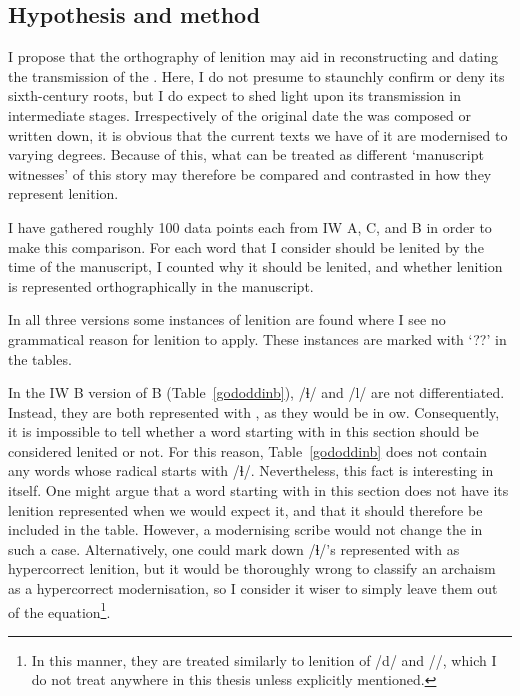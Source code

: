 
\subsection{Hypothesis and method}
I propose that the orthography of lenition may aid in reconstructing and dating the transmission of the . Here, I do not presume to staunchly confirm or deny its sixth-century roots, but I do expect to shed light upon its transmission in intermediate stages. Irrespectively of the original date the  was composed or written down, it is obvious that the current texts we have of it are modernised to varying degrees. Because of this, what can be treated as different `manuscript witnesses' of this story may therefore be compared and contrasted in how they represent lenition.

I have gathered roughly 100 data points each from IW A, C, and B in order to make this comparison. For each word that I consider should be lenited by the time of the manuscript, I counted why it should be lenited, and whether lenition is represented orthographically in the manuscript. 

In all three versions some instances of lenition are found where I see no grammatical reason for lenition to apply. These instances are marked with `??' in the tables. 

In the IW B version of  B (Table~\ref{gododdinb}), /ɬ/ and /l/ are not differentiated. Instead, they are both represented with , as they would be in \gls{ow}. Consequently, it is impossible to tell whether a word starting with  in this section should be considered lenited or not. For this reason, Table~\ref{gododdinb} does not contain any words whose radical starts with /ɬ/. Nevertheless, this fact is interesting in itself. One might argue that a word starting with  in this section does not have its lenition represented when we would expect it, and that it should therefore be included in the table. However, a modernising scribe would not change the  in such a case. Alternatively, one could mark down /ɬ/'s represented with  as hypercorrect lenition, but it would be thoroughly wrong to classify an archaism as a hypercorrect modernisation, so I consider it wiser to simply leave them out of the equation\footnote{In this manner, they are treated similarly to lenition of /d/ and /\rh/, which I do not treat anywhere in this thesis unless explicitly mentioned.}. 


